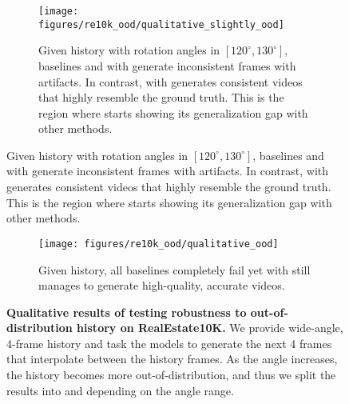 \begin{figure}[b]
    \centering
    \begin{subfigure}[t]{\textwidth}
        \centering
        \texttt{[image: figures/re10k\_ood/qualitative\_slightly\_ood]}
        \caption{
            Given \slightlyoodregion history with rotation angles in $[120^\circ, 130^\circ]$, baselines and \mtd with \HGv generate inconsistent frames with artifacts. In contrast, \mtd with \HGt generates consistent videos that highly resemble the ground truth. This is the region where \HGt starts showing its generalization gap with other methods.
        }
        \label{fig:ood_history_qualitative_slightly_ood}
    \end{subfigure}
\end{figure}
\begin{figure}[t]\ContinuedFloat
    \begin{subfigure}[t]{\textwidth}
        \centering
        \texttt{[image: figures/re10k\_ood/qualitative\_ood]}
        \caption{
            Given \emph{\oodregion} history, all baselines completely fail yet \mtd with \HGt still manages to generate high-quality, accurate videos.
        }
        \label{fig:ood_history_qualitative_ood}
    \end{subfigure}
    \vskip -0.1in
    \caption{
        \textbf{Qualitative results of testing robustness to out-of-distribution history on RealEstate10K.} We provide wide-angle, 4-frame history and task the models to generate the next 4 frames that interpolate between the history frames. As the angle increases, the history becomes more out-of-distribution, and thus we split the results into \slightlyoodregion and \oodregion depending on the angle range. 
    }
    \label{fig:ood_history_qualitative_full}
\end{figure}
